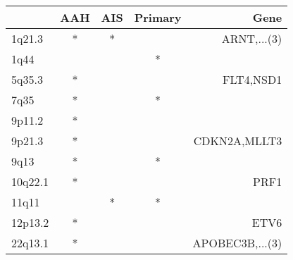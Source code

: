 \begin{tabular}{lcccr}
\toprule
{} & AAH & AIS & Primary &             Gene \\
\midrule
1q21.3  &   * &   * &         &      ARNT,...(3) \\
1q44    &     &     &       * &                  \\
5q35.3  &   * &     &         &        FLT4,NSD1 \\
7q35    &   * &     &       * &                  \\
9p11.2  &   * &     &         &                  \\
9p21.3  &   * &     &         &     CDKN2A,MLLT3 \\
9q13    &   * &     &       * &                  \\
10q22.1 &   * &     &         &             PRF1 \\
11q11   &     &   * &       * &                  \\
12p13.2 &   * &     &         &             ETV6 \\
22q13.1 &   * &     &         &  APOBEC3B,...(3) \\
\bottomrule
\end{tabular}
